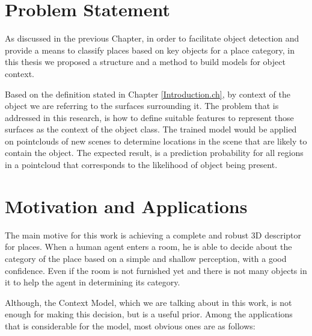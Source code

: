 \label{ModelingObjectContext.ch}
\section{Problem Statement}
\label{ProblemStatement.sec}
As discussed in the previous Chapter, in order to facilitate object detection and provide a means to classify places based on key objects 
for a place category, in this thesis we proposed a structure and a method to build models for object context. 

Based on the definition stated in Chapter \ref{Introduction.ch}, by context of the object we are referring to the surfaces surrounding it. 
The problem that is addressed in this research, is how to define suitable features to represent those surfaces 
as the context of the object class. 
The trained model would be applied on pointclouds of new scenes to determine locations in the scene that are likely
to contain the object.
The expected result, is a prediction probability for all regions in a pointcloud that corresponds to the likelihood 
of object being present.





\section{Motivation and Applications}
\label{MotivationandApplications.sec}
The main motive for this work is achieving a complete and robust 3D descriptor for places. 
When a human agent enters a room, he is able to decide about the category of the place based on a simple and shallow perception, 
with a good confidence. 
Even if the room is not furnished yet and there is not many objects in it to help the agent in determining its category. 

Although, the Context Model, which we are talking about in this work, is not enough for making this decision, but is a useful 
prior.
Among the applications that is considerable for the model, most obvious ones are as follows:


